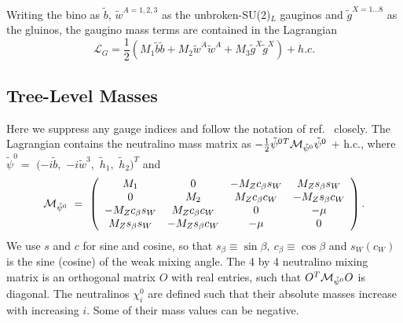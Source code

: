 \documentclass[]{article}
\begin{document}
Writing the bino as ${\tilde b}$, ${\tilde w}^{A=1,2,3}$ as the
unbroken-SU(2)$_L$ 
gauginos and ${\tilde 
g}^{X=1\ldots8}$ as the gluinos, the gaugino mass terms are contained in the
Lagrangian 
\begin{equation}
{\mathcal L}_G = \frac{1}{2} \left( M_1 {\tilde b}{\tilde b} + M_2 {\tilde w}^A{\tilde w}^A
+ M_3 {\tilde g}^X {\tilde g}^X \right) + h.c.
\end{equation}

\subsection{Tree-Level Masses \label{sec:tree}}
Here we suppress any gauge indices and follow the notation of
ref.~\cite{Pierce:1997zz} closely.
The Lagrangian contains the neutralino mass matrix as
$-\frac{1}{2}
{\tilde\psi^0}{}^T{\cal M}_{\tilde\psi^0}\tilde\psi^0$ + h.c., where
$\tilde\psi^0 =$ $(-i\tilde b,$ $-i\tilde w^3,$ $\tilde h_1,$ $\tilde
h_2)^T$ and
%
\begin{equation}
{\cal M}_{\tilde\psi^0} \ =\ \left(\begin{array}{cccc} M_1 & 0 &
-M_Zc_\beta s_W & M_Zs_\beta s_W \\ 0 & M_2 & M_Zc_\beta c_W &
-M_Zs_\beta c_W \\ -M_Zc_\beta s_W & M_Zc_\beta c_W & 0 & -\mu \\
M_Zs_\beta s_W & -M_Zs_\beta c_W & -\mu & 0
\end{array} \right). \label{mchi0}
\end{equation}
%
We use $s$ and $c$ for sine and cosine, so that
$s_\beta\equiv\sin\beta,\ c_{\beta}\equiv\cos\beta$ and $s_W (c_W)$ is
the sine (cosine) of the weak mixing angle.  
The 4 by 4 neutralino mixing matrix is an orthogonal matrix $O$ with real
entries, 
such that $O^T {\cal M}_{\tilde\psi^0} O$ is diagonal.
The neutralinos $\chi^0_i$ are defined such that their absolute masses
increase with increasing $i$.
Some of their mass values can be negative. 
\end{document}
